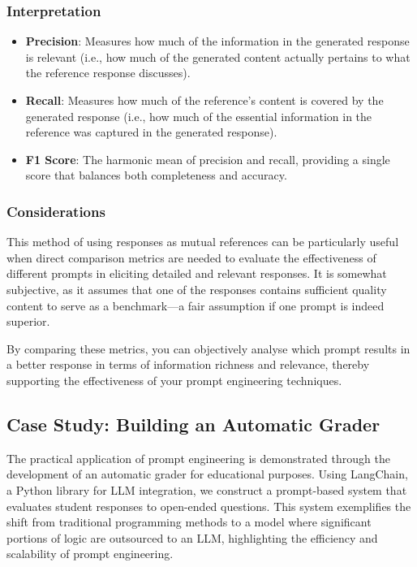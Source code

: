 \documentclass[
]{agujournal2019}
\providecommand{\tightlist}{%
  \setlength{\itemsep}{0pt}\setlength{\parskip}{0pt}}\usepackage{longtable,booktabs,array}
\begin{document}
\subsubsection{Interpretation}\label{interpretation}

\begin{itemize}
\tightlist
\item
  \textbf{Precision}: Measures how much of the information in the
  generated response is relevant (i.e., how much of the generated
  content actually pertains to what the reference response discusses).
\item
  \textbf{Recall}: Measures how much of the reference's content is
  covered by the generated response (i.e., how much of the essential
  information in the reference was captured in the generated response).
\item
  \textbf{F1 Score}: The harmonic mean of precision and recall,
  providing a single score that balances both completeness and accuracy.
\end{itemize}

\subsubsection{Considerations}\label{considerations}

This method of using responses as mutual references can be particularly
useful when direct comparison metrics are needed to evaluate the
effectiveness of different prompts in eliciting detailed and relevant
responses. It is somewhat subjective, as it assumes that one of the
responses contains sufficient quality content to serve as a
benchmark---a fair assumption if one prompt is indeed superior.

By comparing these metrics, you can objectively analyse which prompt
results in a better response in terms of information richness and
relevance, thereby supporting the effectiveness of your prompt
engineering techniques.

\subsection{Case Study: Building an Automatic
Grader}\label{case-study-building-an-automatic-grader}

The practical application of prompt engineering is demonstrated through
the development of an automatic grader for educational purposes. Using
LangChain, a Python library for LLM integration, we construct a
prompt-based system that evaluates student responses to open-ended
questions. This system exemplifies the shift from traditional
programming methods to a model where significant portions of logic are
outsourced to an LLM, highlighting the efficiency and scalability of
prompt engineering.
\end{document}
